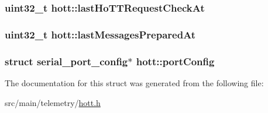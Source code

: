 \hypertarget{structhott_a9515a156e9ac0cb17dab598b44ecc1cc}{
\subsubsection[{last\+Ho\+T\+T\+Request\+Check\+At}]{\setlength{\rightskip}{0pt plus 5cm}uint32\+\_\+t hott\+::last\+Ho\+T\+T\+Request\+Check\+At}}\label{structhott_a9515a156e9ac0cb17dab598b44ecc1cc}
\hypertarget{structhott_a161f29f2e2fbf636d7ef73a113a1a51a}{
\subsubsection[{last\+Messages\+Prepared\+At}]{\setlength{\rightskip}{0pt plus 5cm}uint32\+\_\+t hott\+::last\+Messages\+Prepared\+At}}\label{structhott_a161f29f2e2fbf636d7ef73a113a1a51a}
\hypertarget{structhott_a02eb8255643fae88335061e5100c4375}{
\subsubsection[{port\+Config}]{\setlength{\rightskip}{0pt plus 5cm}struct {\bf serial\+\_\+port\+\_\+config}$\ast$ hott\+::port\+Config}}\label{structhott_a02eb8255643fae88335061e5100c4375}


The documentation for this struct was generated from the following file\+:\begin{DoxyCompactItemize}
\item 
src/main/telemetry/\hyperlink{telemetry_2hott_8h}{hott.\+h}\end{DoxyCompactItemize}

